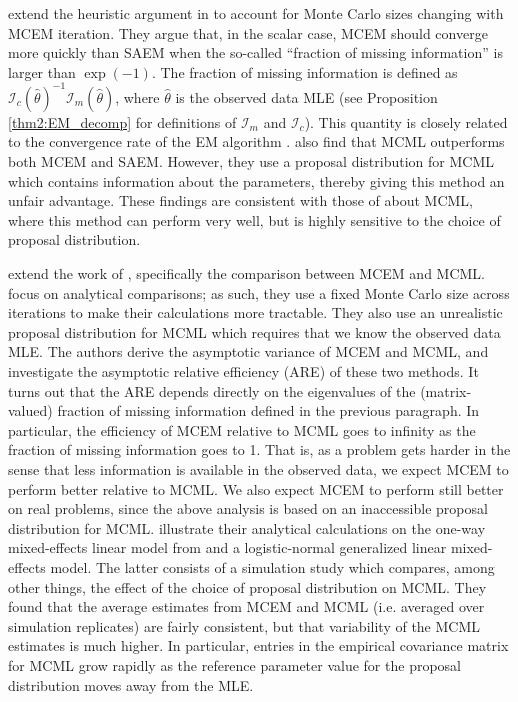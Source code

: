 \documentclass[ss]{imsart}
\theoremstyle{plain}
\theoremstyle{definition}
\theoremstyle{remark}
\begin{document}
\citet{Boo01} extend the heuristic argument in \citet{Gu98I} to account for Monte Carlo sizes changing with MCEM iteration. They argue that, in the scalar case, MCEM should converge more quickly than SAEM when the so-called ``fraction of missing information'' is larger than $\exp(-1)$. The fraction of missing information is defined as $\mathcal{I}_c(\hat{\theta})^{-1} \mathcal{I}_m(\hat{\theta})$, where $\hat{\theta}$ is the observed data MLE (see Proposition \ref{thm2:EM_decomp} for definitions of $\mathcal{I}_m$ and $\mathcal{I}_c$). This quantity is closely related to the convergence rate of the EM algorithm \citep{Men94,McL08}. \citeauthor{Boo01} also find that MCML outperforms both MCEM and SAEM. However, they use a proposal distribution for MCML which contains information about the parameters, thereby giving this method an unfair advantage. These findings are consistent with those of \citet{McC97} about MCML, where this method can perform very well, but is highly sensitive to the choice of proposal distribution.

\citet{Jan03} extend the work of \citet{Boo01}, specifically the comparison between MCEM and MCML. \citeauthor{Jan03} focus on analytical comparisons; as such, they use a fixed Monte Carlo size across iterations to make their calculations more tractable. They also use an unrealistic proposal distribution for MCML which requires that we know the observed data MLE. The authors derive the asymptotic variance of MCEM and MCML, and investigate the asymptotic relative efficiency (ARE) of these two methods. It turns out that the ARE depends directly on the eigenvalues of the (matrix-valued) fraction of missing information defined in the previous paragraph. In particular, the efficiency of MCEM relative to MCML goes to infinity as the fraction of missing information goes to 1. That is, as a problem gets harder in the sense that less information is available in the observed data, we expect MCEM to perform better relative to MCML. We also expect MCEM to perform still better on real problems, since the above analysis is based on an inaccessible proposal distribution for MCML. \citeauthor{Jan03} illustrate their analytical calculations on the one-way mixed-effects linear model from \citet{Boo01} and a logistic-normal generalized linear mixed-effects model. The latter consists of a simulation study which compares, among other things, the effect of the choice of proposal distribution on MCML. They found that the average estimates from MCEM and MCML (i.e. averaged over simulation replicates) are fairly consistent, but that variability of the MCML estimates is much higher. In particular, entries in the empirical covariance matrix for MCML grow rapidly as the reference parameter value for the proposal distribution moves away from the MLE.
\end{document}
